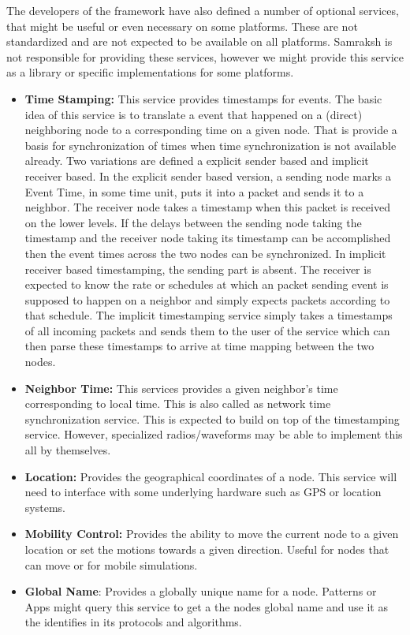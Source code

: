The developers of the framework have also defined a number of optional services, that might be useful or even necessary on some platforms.
These are not standardized and are not expected to be available on all platforms. Samraksh is not responsible for providing these services, however
we might provide this service as a library or specific implementations for some platforms.
\begin{itemize}
	\item \textbf{Time Stamping:} This service provides timestamps for events.  The basic idea of this service is to translate a event that happened on a (direct) neighboring node to a corresponding time on a given node. That is provide a basis for synchronization of times when time synchronization is not available already.
	Two variations are defined a explicit sender based and implicit receiver based. In the explicit sender based version, a sending node marks a Event Time, in some time unit, puts it into a packet and sends it to a neighbor. The receiver node takes a timestamp when this packet is received on the lower levels. If the delays between the sending node taking the timestamp and the receiver node taking its timestamp can be accomplished then the event times across the two nodes can be  synchronized. In implicit receiver based timestamping, the sending part is absent. The receiver is expected to know the rate or schedules  at which an packet sending event is supposed to happen on a neighbor and simply expects packets according to that schedule. The implicit timestamping service simply takes a timestamps of all incoming packets and sends them to the user of the service which can then parse these timestamps to arrive at time mapping between the two nodes.
	
	\item \textbf{Neighbor Time:} This services provides a given neighbor's time corresponding to local time. This is also called as network time synchronization service. This is expected to build on top of the timestamping service. However, specialized radios/waveforms may be able to implement this all by themselves.
	
	\item \textbf{Location:} Provides the geographical coordinates of a node. This service will need to interface with some underlying hardware such as GPS or location systems.
	
	\item \textbf{Mobility Control:} Provides the ability to move the current node to a given location or set the motions towards a given direction. Useful for nodes that can move or for mobile simulations.
	
	\item \textbf{ Global Name}: Provides a globally unique name for a node. Patterns or Apps might query this service to get a the nodes global name and use it as the identifies in its protocols and algorithms.
	
\end{itemize}


